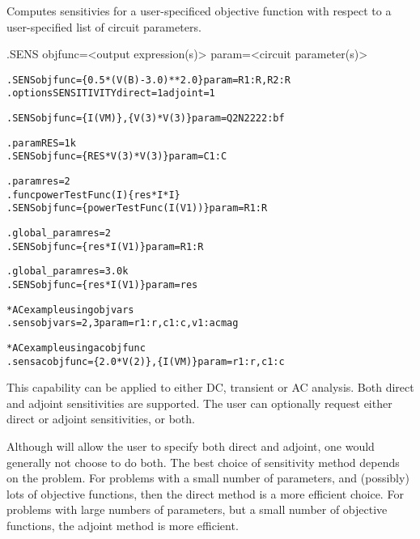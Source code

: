 


 
Computes sensitivies for a user-specificed objective function
with respect to a user-specified list of circuit parameters.  


\begin{Command}

\format
.SENS objfunc=<output expression(s)> param=<circuit parameter(s)>  

\examples
\begin{alltt}
.SENS objfunc=\{0.5*(V(B)-3.0)**2.0\} param=R1:R,R2:R
.options SENSITIVITY direct=1 adjoint=1

.SENS objfunc=\{I(VM)\},\{V(3)*V(3)\} param= Q2N2222:bf

.param RES=1k
.SENS objfunc=\{RES*V(3)*V(3)\} param=C1:C

.param res=2
.func powerTestFunc(I) \{res*I*I\}
.SENS objfunc=\{powerTestFunc(I(V1))\} param=R1:R

.global\_param res=2
.SENS objfunc=\{res*I(V1)\} param=R1:R

.global\_param res=3.0k
.SENS objfunc=\{res*I(V1)\} param=res

* AC example using objvars
.sens objvars=2,3 param=r1:r,c1:c,v1:acmag

* AC example using acobjfunc
.sens acobjfunc=\{2.0*V(2)\},\{I(VM)\} param=r1:r,c1:c
\end{alltt}

\comments

This capability can be applied to either DC, transient or AC analysis.  
Both direct and adjoint sensitivities are supported. 
The user can optionally request either direct or adjoint sensitivities, 
or both.  

Although \Xyce{} will allow the user to specify both direct and 
adjoint, one would generally not choose to do both.
The best choice of sensitivity method depends on the problem.  For problems 
with a small number of parameters, and (possibly) lots of objective functions, 
then the direct method is a more efficient choice.  For problems with large 
numbers of parameters, but a small number of objective functions, the 
adjoint method is more efficient.


\end{Command}
